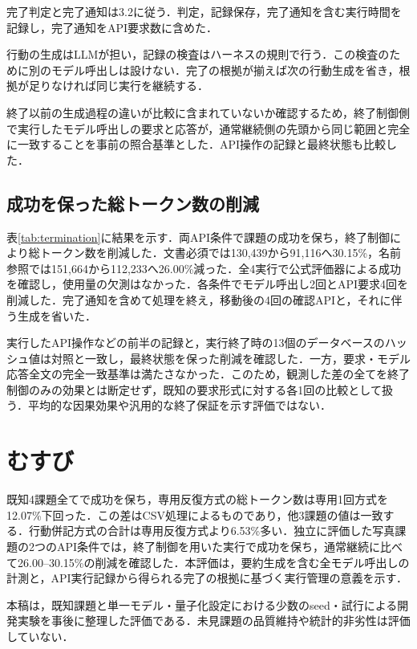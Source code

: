 \documentclass[letter]{ieicej}
\begin{document}
完了判定と完了通知は3.2に従う．判定，記録保存，完了通知を含む実行時間を記録し，完了通知をAPI要求数に含めた．

行動の生成はLLMが担い，記録の検査はハーネスの規則で行う．この検査のために別のモデル呼出しは設けない．完了の根拠が揃えば次の行動生成を省き，根拠が足りなければ同じ実行を継続する．

終了以前の生成過程の違いが比較に含まれていないか確認するため，終了制御側で実行したモデル呼出しの要求と応答が，通常継続側の先頭から同じ範囲と完全に一致することを事前の照合基準とした．API操作の記録と最終状態も比較した．

\subsection{成功を保った総トークン数の削減}

表\ref{tab:termination}に結果を示す．両API条件で課題の成功を保ち，終了制御により総トークン数を削減した．文書必須では130,439から91,116へ30.15\%，名前参照では151,664から112,233へ26.00\%減った．全4実行で公式評価器による成功を確認し，使用量の欠測はなかった．各条件でモデル呼出し2回とAPI要求4回を削減した．完了通知を含めて処理を終え，移動後の4回の確認APIと，それに伴う生成を省いた．

\TerminationResultsTable

\par\noindent\begin{minipage}{\columnwidth}
実行したAPI操作などの前半の記録と，実行終了時の13個のデータベースのハッシュ値は対照と一致し，最終状態を保った削減を確認した．一方，要求・モデル応答全文の完全一致基準は満たさなかった．このため，観測した差の全てを終了制御のみの効果とは断定せず，既知の要求形式に対する各1回の比較として扱う．平均的な因果効果や汎用的な終了保証を示す評価ではない．
\end{minipage}\par{}

\section{むすび}

既知4課題全てで成功を保ち，専用反復方式の総トークン数は専用1回方式を12.07\%下回った．この差はCSV処理によるものであり，他3課題の値は一致する．行動併記方式の合計は専用反復方式より6.53\%多い．独立に評価した写真課題の2つのAPI条件では，終了制御を用いた実行で成功を保ち，通常継続に比べて26.00--30.15\%の削減を確認した．本評価は，要約生成を含む全モデル呼出しの計測と，API実行記録から得られる完了の根拠に基づく実行管理の意義を示す．

本稿は，既知課題と単一モデル・量子化設定における少数のseed・試行による開発実験を事後に整理した評価である．未見課題の品質維持や統計的非劣性は評価していない．


\end{document}

